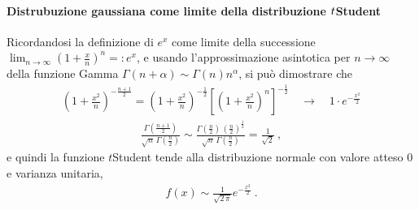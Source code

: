 \documentclass[letterpaper,10pt,italian]{jupyterBook}
\begin{document}
\paragraph{Distrubuzione gaussiana come limite della distribuzione \protect\(t\protect\)\sphinxhyphen{}Student}
\label{\detokenize{ch/statistics/pfun_continuous_examples:distrubuzione-gaussiana-come-limite-della-distribuzione-t-student}}
\sphinxAtStartPar
Ricordandosi la definizione di \(e^x\) come limite della successione \(\lim_{n \rightarrow \infty} \left( 1 + \frac{x}{n} \right)^n =: e^x\), e usando l’approssimazione asintotica per \(n \rightarrow \infty\) della funzione Gamma \(\Gamma(n+\alpha) \sim \Gamma(n)n^{\alpha}\), si può dimostrare che
\begin{equation*}
\begin{split}\left( 1 + \frac{x^2}{n} \right)^{-\frac{n+1}{2}} = \left( 1 + \frac{x^2}{n} \right)^{-\frac{1}{2}} \left[ \left( 1 + \frac{x^2}{n} \right)^n \right]^{-\frac{1}{2}} \quad \rightarrow \quad 1 \cdot e^{-\frac{x^2}{2}}\end{split}
\end{equation*}\begin{equation*}
\begin{split}\frac{\Gamma\left(\frac{n+1}{2}\right)}{\sqrt{n} \, \Gamma\left( \frac{n}{2} \right)} \sim
  \frac{\Gamma\left(\frac{n}{2}\right) \, \left(\frac{n}{2}\right)^{\frac{1}{2}}}{\sqrt{n} \, \Gamma\left( \frac{n}{2} \right)} = \frac{1}{\sqrt{2}} \ , \end{split}
\end{equation*}
\sphinxAtStartPar
e quindi la funzione \(t\)\sphinxhyphen{}Student tende alla distribuzione normale con valore atteso \(0\) e varianza unitaria,
\begin{equation*}
\begin{split}f(x) \sim \frac{1}{\sqrt{2 \,\pi}} e^{-\frac{x^2}{2}} \ .\end{split}
\end{equation*}
\sphinxstepscope
\end{document}
